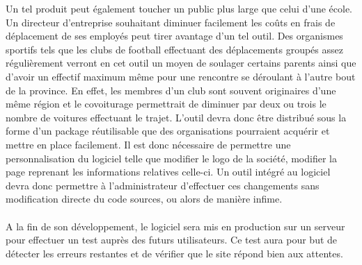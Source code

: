 \documentclass[12pt, a4paper, oneside]{article}
\begin{document}
    \indent Un tel produit peut également toucher un public plus large que celui d'une école. Un directeur d'entreprise souhaitant diminuer facilement les coûts en frais de déplacement de ses employés peut tirer avantage d'un tel outil. Des organismes sportifs tels que les clubs de football effectuant des déplacements groupés assez régulièrement verront en cet outil un moyen de soulager certains parents ainsi que d'avoir un effectif maximum même pour une rencontre se déroulant à l'autre bout de la province. En effet, les membres d'un club sont souvent originaires d'une même région et le covoiturage permettrait de diminuer par deux ou trois le nombre de voitures effectuant le trajet. L'outil devra donc être distribué sous la forme d'un package réutilisable que des organisations pourraient acquérir et mettre en place facilement. Il est donc nécessaire de permettre une personnalisation du logiciel telle que modifier le logo de la société, modifier la page reprenant les informations relatives celle-ci. Un outil intégré au logiciel devra donc permettre à l'administrateur d'effectuer ces changements sans modification directe du code sources, ou alors de manière infime.\\\\
    \indent A la fin de son développement, le logiciel sera mis en production sur un serveur pour effectuer un test auprès des futurs utilisateurs. Ce test aura pour but de détecter les erreurs restantes et de vérifier que le site répond bien aux attentes.
\end{document}
